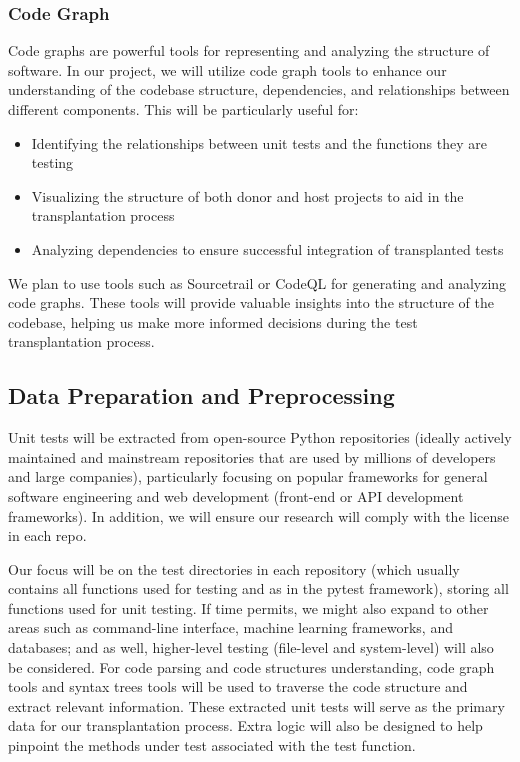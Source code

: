 \documentclass[sigconf]{acmart}
\begin{document}
\subsubsection{Code Graph}
Code graphs are powerful tools for representing and analyzing the structure of software. In our project, we will utilize code graph tools to enhance our understanding of the codebase structure, dependencies, and relationships between different components. This will be particularly useful for:
\begin{itemize}
\item Identifying the relationships between unit tests and the functions they are testing
\item Visualizing the structure of both donor and host projects to aid in the transplantation process
\item Analyzing dependencies to ensure successful integration of transplanted tests
\end{itemize}
We plan to use tools such as Sourcetrail or CodeQL for generating and analyzing code graphs. These tools will provide valuable insights into the structure of the codebase, helping us make more informed decisions during the test transplantation process.

\subsection{Data Preparation and Preprocessing}
%
Unit tests will be extracted from open-source Python repositories (ideally actively maintained and mainstream repositories that are used by millions of developers and large companies), particularly focusing on popular frameworks for general software engineering and web development (front-end or API development frameworks).
%
In addition, we will ensure our research will comply with the license in each repo.

%
Our focus will be on the test directories in each repository (which usually contains all functions used for testing and as in the pytest framework), storing all functions used for unit testing.
%
If time permits, we might also expand to other areas such as command-line interface, machine learning frameworks, and databases; and as well, higher-level testing (file-level and system-level) will also be considered.
%
For code parsing and code structures understanding, code graph tools and syntax trees tools will be used to traverse the code structure and extract relevant information.
%
These extracted unit tests will serve as the primary data for our transplantation process. Extra logic will also be designed to help pinpoint the methods under test associated with the test function.
\end{document}
